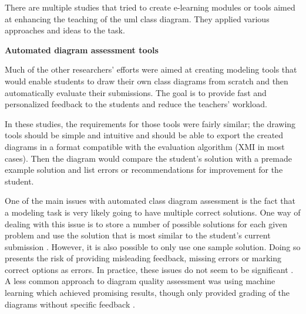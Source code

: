 

There are multiple studies that tried to create e-learning modules or tools aimed at enhancing the teaching of the \ac{uml} class diagram. They applied various approaches and ideas to the task. %


\textbf{Automated diagram assessment tools}

Much of the other researchers' efforts were aimed at creating modeling tools that would enable students to draw their own class diagrams from scratch and then automatically evaluate their submissions. The goal is to provide fast and personalized feedback to the students and reduce the teachers' workload. 

In these studies, the requirements for those tools were fairly similar; the drawing tools should be simple and intuitive and should be able to export the created diagrams in a format compatible with the evaluation algorithm (XMI in most cases). Then the diagram would compare the student's solution with a premade example solution and list errors or recommendations for improvement for the student. 

One of the main issues with automated class diagram assessment is the fact that a modeling task is very likely going to have multiple correct solutions. One way of dealing with this issue is to store a number of possible solutions for each given problem and use the solution that is most similar to the student's current submission \cite{soler2010formative}. However, it is also possible to only use one sample solution. Doing so presents the risk of providing misleading feedback, missing errors or marking correct options as errors. In practice, these issues do not seem to be significant \cite{schramm2012teaching}. A less common approach to diagram quality assessment was using machine learning which achieved promising results, though only provided grading of the diagrams without specific feedback \cite{BERGSTROM2022111413}. %

